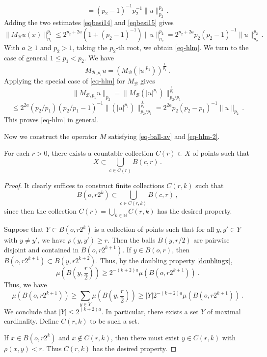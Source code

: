 \begin{equation}\label{eqbesi15}
   =(p_2-1)^{-1} p_2^{-1}\|u\|_{p_2}^{p_2}\, .
\end{equation}
Adding the two estimates
\eqref{eqbesi14} and \eqref{eqbesi15} gives
\begin{equation}
    \|M_{\mathcal{B}}u(x)\|_{p_2}^{p_2}
   \le 2^{p_2+2a} (1+(p_2-1)^{-1})\|u\|_{p_2}^{p_2}
   = 2^{p_2+2a} p_2(p_2-1)^{-1}\|u\|_{p_2}^{p_2}
   \, .
   \end{equation}
With $a\ge 1$ and $p_2>1$, taking the $p_2$-th root, we obtain \eqref{eq-hlm}.
We turn to the case of general
$1\le p_1<p_2$.
We have
\begin{equation}
    M_{\mathcal{B},p_1}u=(M_{\mathcal{B}} (|u|^{p_1}))^{\frac 1{p_1}}\, .
\end{equation}
Applying the special case of \eqref{eq-hlm} for $M_{\mathcal{B}}$ gives
\begin{equation}
    \|M_{\mathcal{B},p_1}u\|_{p_2}=
    \|M_{\mathcal{B}} (|u|^{p_1})\|_{p_2/p_1}^{\frac 1{p_1}}
\end{equation}
\begin{equation}
    \le 2^{2a} (p_2/p_1) (p_2/p_1-1)^{-1}
    \|(|u|^{p_1})\|_{p_2/p_1}^{\frac 1{p_1}}
    =2^{2a} p_2(p_2-p_1)^{-1}\|u\|_{p_2}\, .
\end{equation}
This proves \eqref{eq-hlm} in general.

Now we construct the operator $M$ satisfying \eqref{eq-ball-av} and \eqref{eq-hlm-2}.

\begin{lemma}
    \label{covering-separable-space}
    For each $r > 0$, there exists a countable collection $C(r) \subset X$ of points such that
    $$
        X \subset \bigcup_{c \in C(r)} B(c, r)\,.
    $$
\end{lemma}

\begin{proof}
    It clearly suffices to construct finite collections $C(r,k)$ such that
    $$
        B(o, r2^k) \subset \bigcup_{c \in C(r,k)} B(c,r)\,,
    $$
    since then the collection $C(r) = \bigcup_{k \in \mathbb{N}} C(r,k)$ has the desired property.

    Suppose that $Y \subset B(o, r2^k)$ is a collection of points such that for all $y, y' \in Y$ with $y \ne y'$, we have $\rho(y,y') \ge r$. Then the balls $B(y, r/2)$ are pairwise disjoint and contained in $B(o, r2^{k+1})$. If $y \in B(o, r)$, then $B(o, r2^{k+1}) \subset B(y, r2^{k+2})$. Thus, by the doubling property \eqref{doublingx},
    $$
        \mu(B(y, \frac{r}{2})) \ge 2^{-(k+2)a} \mu(B(o, r2^{k+1}))\,.
    $$
    Thus, we have
    $$
        \mu(B(o, r2^{k+1})) \ge \sum_{y \in Y} \mu(B(y, \frac{r}{2})) \ge |Y| 2^{-(k+2)a} \mu(B(o, r2^{k+1}))\,.
    $$
    We conclude that $|Y| \le 2^{(k+2)a}$. In particular, there exists a set $Y$ of maximal cardinality. Define $C(r,k)$ to be such a set.

    If $x \in B(o, r2^k)$ and $x \notin C(r,k)$, then there must exist $y \in C(r,k)$ with $\rho(x,y) < r$. Thus $C(r,k)$ has the desired property.
\end{proof}

